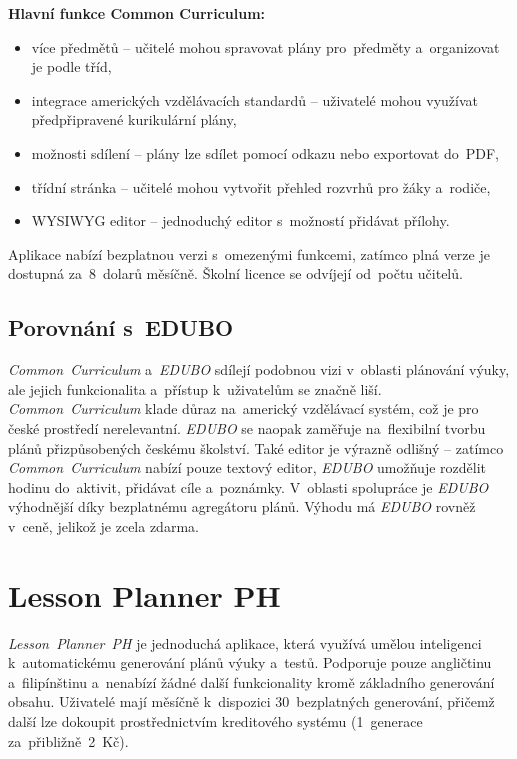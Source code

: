 \documentclass[male,czech,api_bc]{kitheses}
\begin{document}
\textbf{Hlavní funkce Common Curriculum:}
\begin{itemize}
	\item více předmětů – učitelé mohou spravovat plány pro~předměty a~organizovat je podle tříd,
	\item integrace amerických vzdělávacích standardů – uživatelé mohou využívat předpřipravené kurikulární plány,
	\item možnosti sdílení – plány lze sdílet pomocí odkazu nebo exportovat do~PDF,
	\item třídní stránka – učitelé mohou vytvořit přehled rozvrhů pro žáky a~rodiče,
	\item WYSIWYG editor – jednoduchý editor s~možností přidávat přílohy.
\end{itemize}

Aplikace nabízí bezplatnou verzi s~omezenými funkcemi, zatímco plná verze je dostupná za~8~dolarů měsíčně. Školní licence se odvíjejí od~počtu učitelů.

\subsection{Porovnání s~EDUBO}  
\textit{Common~Curriculum} a~\textit{EDUBO} sdílejí podobnou vizi v~oblasti plánování výuky, ale jejich funkcionalita a~přístup k~uživatelům se značně liší. \textit{Common~Curriculum} klade důraz na~americký vzdělávací systém, což je pro české prostředí nerelevantní. \textit{EDUBO} se naopak zaměřuje na~flexibilní tvorbu plánů přizpůsobených českému školství. Také editor je výrazně odlišný – zatímco \textit{Common~Curriculum} nabízí pouze textový editor, \textit{EDUBO} umožňuje rozdělit hodinu do~aktivit, přidávat cíle a~poznámky. V~oblasti spolupráce je \textit{EDUBO} výhodnější díky bezplatnému agregátoru plánů. Výhodu má \textit{EDUBO} rovněž v~ceně, jelikož je zcela zdarma.

\section{Lesson Planner PH}

\textit{Lesson~Planner~PH} je jednoduchá aplikace, která využívá umělou inteligenci k~automatickému generování plánů výuky a~testů. Podporuje pouze angličtinu a~filipínštinu a~nenabízí žádné další funkcionality kromě základního generování obsahu. Uživatelé mají měsíčně k~dispozici 30~bezplatných generování, přičemž další lze dokoupit prostřednictvím kreditového systému (1~generace za~přibližně~2~Kč).
\end{document}
